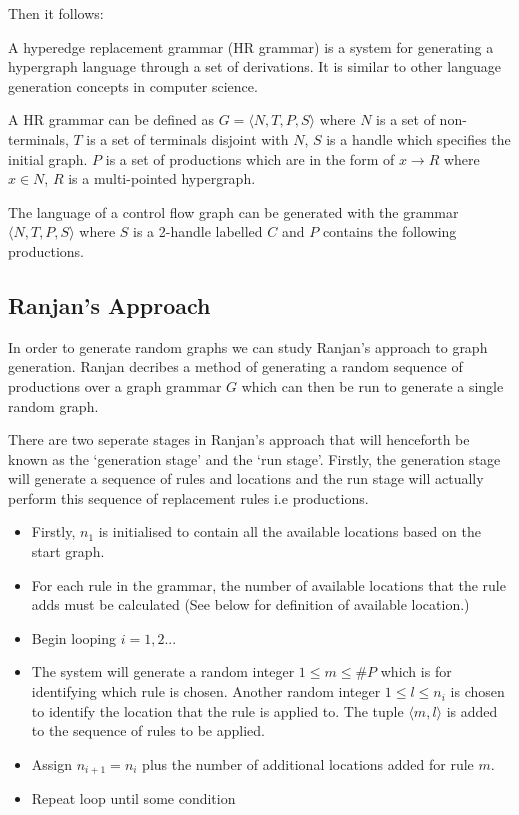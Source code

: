     Then it follows:
    

    A hyperedge replacement grammar (HR grammar) is a system for generating a hypergraph language through a set of derivations. It is similar to other language generation concepts in computer science.

    A HR grammar can be defined as $G = \langle N, T, P, S \rangle$ where $N$ is a set of non-terminals, $T$ is a set of terminals disjoint with $N$, $S$ is a handle which specifies the initial graph. $P$ is a set of productions which are in the form of $x \to R$ where $x \in N$, $R$ is a multi-pointed hypergraph.

    The language of a control flow graph can be generated with the grammar $\langle N, T, P, S \rangle$ where $S$ is a 2-handle labelled $C$ and $P$ contains the following productions.
    

\subsection{Ranjan's Approach}
  In order to generate random graphs we can study Ranjan's approach to graph generation. Ranjan\cite{Ranjan} decribes a method of generating a random sequence of productions over a graph grammar $G$ which can then be run to generate a single random graph.

  There are two seperate stages in Ranjan's approach that will henceforth be known as the `generation stage' and the `run stage'. Firstly, the generation stage will generate a sequence of rules and locations and the run stage will actually perform this sequence of replacement rules i.e productions.

  \begin{itemize}
  \item Firstly, $n_1$ is initialised to contain all the available locations based on the start graph.
  \item For each rule in the grammar, the number of available locations that the rule adds must be calculated (See below for definition of available location.)
  \item Begin looping $i = 1,2...$
  \item The system will generate a random integer $1 \leq m \leq \#P$ which is for identifying which rule is chosen. Another random integer $1 \leq l \leq n_i$ is chosen to identify the location that the rule is applied to. The tuple $\langle m,l \rangle$ is added to the sequence of rules to be applied.
  \item Assign $n_{i+1} = n_i$ plus the number of additional locations added for rule $m$. 
  \item Repeat loop until some condition
  \end{itemize}

